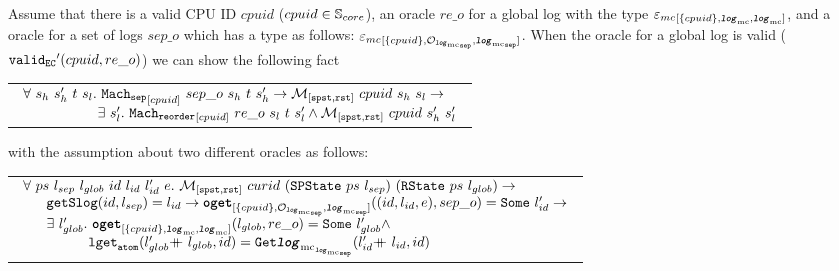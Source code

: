 \begin{lemma}
\label{lemma:chapter:conlink:separate-refines-reorder}
Assume that there is a valid CPU ID $cpuid$ ($cpuid \in {\mathbb{S}_{core}}$),
an oracle $re\_o$ for a global log with the type ${{{\varepsilon_{mc}}}_{[{\{cpuid\}}, {{{\mathrm{\texttt{\textbf{\textit{log}}}}}_{\mathrm{mc}}}}, {{{\mathrm{\texttt{\textbf{\textit{log}}}}}_{\mathrm{mc}}}}]}}$, and a oracle for a set of logs 
$sep\_o$ which has a type as follows: ${{{\varepsilon_{mc}}}_{[{\{cpuid\}}, {{\mathcal{O}_{{{{\mathrm{\texttt{\textbf{\textit{log}}}}}_{\mathrm{mc}}}_{{\mathrm{\texttt{sep}}}}}}}}, {{{{\mathrm{\texttt{\textbf{\textit{log}}}}}_{\mathrm{mc}}}_{{\mathrm{\texttt{sep}}}}}}]}}$.
When the oracle for a global log is valid (${{{{\mathrm{\texttt{valid}}}_{{\mathrm{\texttt{EC}}}}}'}({cpuid}, {re\_o })}$) we can show the following fact
\begin{center}
\begin{tabular}{P{0.95\textwidth}}
$
\begin{array}{l}
\forall \ s_h \ s_h' \ t \ s_l . \ \singleseparatestep{cpuid}{sep\_o}{s_h}{t}{s_h'} \rightarrow  \matchspstaterstate{cpuid}{s_h}{s_l} \rightarrow \\
\ \ \ \ \ \ \ \ \ \ \ \ \ \ \ \ \exists\ s_l' . \  \singlereorderstep{cpuid}{re\_o}{s_l}{t}{s_l'} \wedge  \matchspstaterstate{cpuid}{s_h'}{s_l'}\\
\end{array}
$
\end{tabular}
\end{center}
with the assumption about two different oracles as follows:
\begin{center}
\begin{tabular}{P{0.95\textwidth}}
$
\begin{array}{l}
\forall \ ps \ l_{sep} \ l_{glob} \ id  \ l_{id} \ l_{id}' \ e .\ \matchspstaterstate{curid}{(\spstate{ps}{l_{sep}})}{(\rstate{ps}{l_{glob}})} \rightarrow \\
 \ \ \ \ \ \getseparatelog{id}{l_{sep}}{l_{id}} \rightarrow   \oget{\set{cpuid}}{\separateoraclelogtypekwd}{\separatelogtypekwd}{(id, l_{id}, e)}{sep\_o}{l_{id}'} \rightarrow \\
 \ \ \ \ \  \exists \ l_{glob}' .\ \oget{\set{cpuid}}{\mclog}{\mclog}{l_{glob}}{re\_o}{l_{glob}'} \wedge \\
 \ \ \ \ \ \ \ \ \ \  \ \ \ \ \loggetatom{\listapp{l_{glob}'}{l_{glob}}}{id}{\separatelogtwolognoeq{\listapp{l_{id}'}{l_{id}}}{id}} \\
\end{array}
$
\end{tabular}
\end{center}
\end{lemma}





